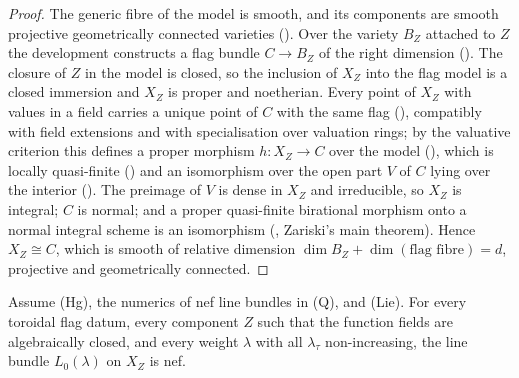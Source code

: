 \begin{proof}
The generic fibre of the model is smooth, and its components are smooth projective geometrically connected varieties
(). Over the variety $B_Z$ attached to $Z$ the
development constructs a flag bundle $C\to B_Z$ of the right dimension ().
The closure of $Z$ in the model is closed, so the inclusion of $X_Z$ into the flag model is a closed immersion and
$X_Z$ is proper and noetherian. Every point of $X_Z$ with values
in a field carries a unique point of $C$ with the same flag
(), compatibly with field extensions and with
specialisation over valuation rings; by the valuative criterion this defines a proper morphism $h\colon X_Z\to C$ over
the model (), which is locally quasi-finite
() and an isomorphism over the open part $V$ of $C$ lying
over the interior (). The preimage of $V$ is dense in
$X_Z$ and irreducible, so $X_Z$ is integral; $C$ is normal; and a proper quasi-finite birational morphism onto a normal
integral scheme is an isomorphism (, Zariski's main
theorem). Hence $X_Z\cong C$, which is smooth of relative dimension $\dim B_Z+\dim(\text{flag fibre})=d$, projective and
geometrically connected.
\end{proof}

\begin{proposition}\label{pf:lift2:nef}
Assume \textup{(Hg)}, the numerics of nef line bundles in \textup{(Q)}, and \textup{(Lie)}. For every toroidal flag datum,
every component $Z$ such that the function fields are algebraically closed, and every weight $\lambda$ with all
$\lambda_\tau$ non-increasing, the line bundle $L_0(\lambda)$ on $X_Z$ is nef.
\end{proposition}

